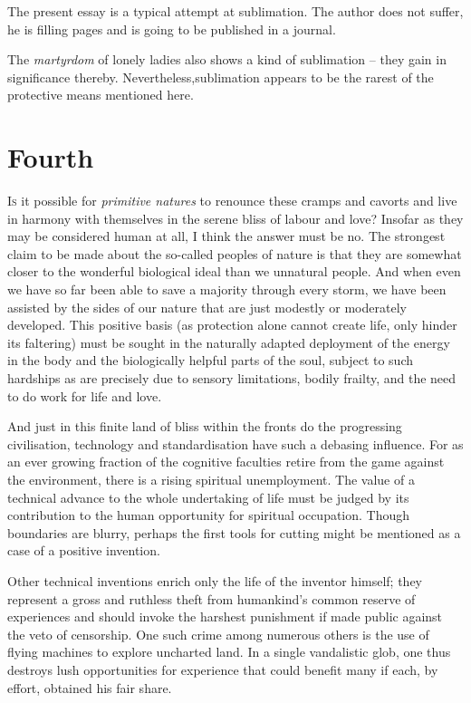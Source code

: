 \documentclass[draft,a4paper,10pt,twocolumn]{article}
\begin{document}
The present essay is a typical attempt at sublimation. The author does not suffer, he is filling pages and is going to be published in a journal.

The \emph{martyrdom} of lonely ladies also shows a kind of sublimation -- they gain in significance thereby. Nevertheless,sublimation appears to be the rarest of the protective means mentioned here.

\section{Fourth}

\lettrine[lines=2]{I}{s} it possible for \emph{primitive natures} to renounce these cramps and cavorts and live in harmony with themselves in the serene bliss of labour and love? Insofar as they may be considered human at all, I think the answer must be no. The strongest claim to be made about the so-called peoples of nature is that they are somewhat closer to the wonderful biological ideal than we unnatural people. And when even we have so far been able to save a majority through every storm, we have been assisted by the sides of our nature that are just modestly or moderately developed. This positive basis (as protection alone cannot create life, only hinder its faltering) must be sought in the naturally adapted deployment of the energy in the body and the biologically helpful parts of the soul, subject to such hardships as are precisely due to sensory limitations, bodily frailty, and the need to do work for life and love.

And just in this finite land of bliss within the fronts do the progressing civilisation, technology and standardisation have such a debasing influence. For as an ever growing fraction of the cognitive faculties retire from the game against the environment, there is a rising spiritual unemployment. The value of a technical advance to the whole undertaking of life must be judged by its contribution to the human opportunity for spiritual occupation. Though boundaries are blurry, perhaps the first tools for cutting might be mentioned as a case of a positive invention.

Other technical inventions enrich only the life of the inventor himself; they represent a gross and ruthless theft from humankind's common reserve of experiences and should invoke the harshest punishment if made public against the veto of censorship. One such crime among numerous others is the use of flying machines to explore uncharted land. In a single vandalistic glob, one thus destroys lush opportunities for experience that could benefit many if each, by effort, obtained his fair share.
\end{document}
